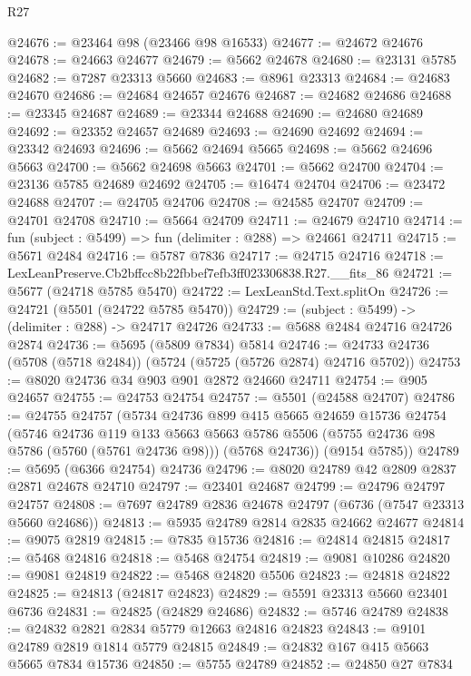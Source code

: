 \begin{lexlean}{R27}
\begin{coremodule}
@24676 := @23464 @98 (@23466 @98 @16533)
@24677 := @24672 @24676
@24678 := @24663 @24677
@24679 := @5662 @24678
@24680 := @23131 @5785
@24682 := @7287 @23313 @5660
@24683 := @8961 @23313
@24684 := @24683 @24670
@24686 := @24684 @24657 @24676
@24687 := @24682 @24686
@24688 := @23345 @24687
@24689 := @23344 @24688
@24690 := @24680 @24689
@24692 := @23352 @24657 @24689
@24693 := @24690 @24692
@24694 := @23342 @24693
@24696 := @5662 @24694 @5665
@24698 := @5662 @24696 @5663
@24700 := @5662 @24698 @5663
@24701 := @5662 @24700
@24704 := @23136 @5785 @24689 @24692
@24705 := @16474 @24704
@24706 := @23472 @24688
@24707 := @24705 @24706
@24708 := @24585 @24707
@24709 := @24701 @24708
@24710 := @5664 @24709
@24711 := @24679 @24710
@24714 := fun (subject : @5499) => fun (delimiter : @288) => @24661 @24711
@24715 := @5671 @2484
@24716 := @5787 @7836
@24717 := @24715 @24716
@24718 := LexLeanPreserve.Cb2bffcc8b22fbbef7efb3ff023306838.R27.__fits_86
@24721 := @5677 (@24718 @5785 @5470)
@24722 := LexLeanStd.Text.splitOn
@24726 := @24721 (@5501 (@24722 @5785 @5470))
@24729 := (subject : @5499) -> (delimiter : @288) -> @24717 @24726
@24733 := @5688 @2484 @24716 @24726 @2874
@24736 := @5695 (@5809 @7834) @5814
@24746 := @24733 @24736 (@5708 (@5718 @2484)) (@5724 (@5725 (@5726 @2874) @24716 @5702))
@24753 := @8020 @24736 @34 @903 @901 @2872 @24660 @24711
@24754 := @905 @24657
@24755 := @24753 @24754
@24757 := @5501 (@24588 @24707)
@24786 := @24755
    @24757
    (@5734
      @24736
      @899
      @415
      @5665
      @24659
      @15736
      @24754
      (@5746
        @24736
        @119
        @133
        @5663
        @5663
        @5786
        @5506
        (@5755 @24736 @98 @5786 (@5760 (@5761 @24736 @98)))
        (@5768 @24736))
      (@9154 @5785))
@24789 := @5695 (@6366 @24754) @24736
@24796 := @8020 @24789 @42 @2809 @2837 @2871 @24678 @24710
@24797 := @23401 @24687
@24799 := @24796 @24797 @24757
@24808 := @7697 @24789 @2836 @24678 @24797 (@6736 (@7547 @23313 @5660 @24686))
@24813 := @5935 @24789 @2814 @2835 @24662 @24677
@24814 := @9075 @2819
@24815 := @7835 @15736
@24816 := @24814 @24815
@24817 := @5468 @24816
@24818 := @5468 @24754
@24819 := @9081 @10286
@24820 := @9081 @24819
@24822 := @5468 @24820 @5506
@24823 := @24818 @24822
@24825 := @24813 (@24817 @24823)
@24829 := @5591 @23313 @5660 @23401 @6736
@24831 := @24825 (@24829 @24686)
@24832 := @5746 @24789
@24838 := @24832 @2821 @2834 @5779 @12663 @24816 @24823
@24843 := @9101 @24789 @2819 @1814 @5779 @24815
@24849 := @24832 @167 @415 @5663 @5665 @7834 @15736
@24850 := @5755 @24789
@24852 := @24850 @27 @7834

\end{coremodule}
\end{lexlean}
